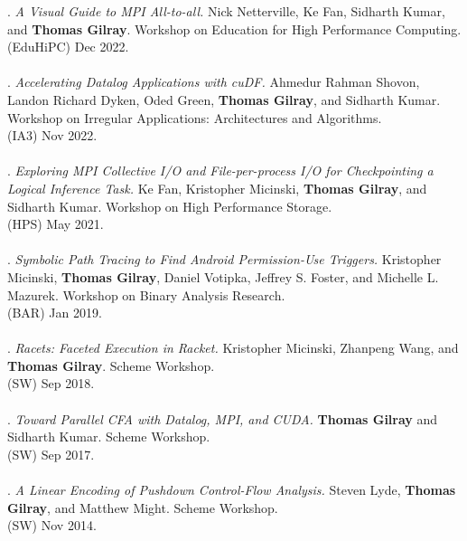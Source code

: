 \paper. \textit{A Visual Guide to MPI All-to-all.}
Nick Netterville, Ke Fan, Sidharth Kumar, and \textbf{Thomas Gilray}.
Workshop on Education for High Performance Computing.
\\(EduHiPC) Dec 2022. 
\\ \vspace{-0.1cm}\\
\paper. \textit{Accelerating Datalog Applications with cuDF.}
Ahmedur Rahman Shovon, Landon Richard Dyken, Oded Green, \textbf{Thomas Gilray}, and Sidharth Kumar.
Workshop on Irregular Applications: Architectures and Algorithms.
\\(IA3) Nov 2022. 
\\ \vspace{-0.1cm}\\
\paper. \textit{Exploring MPI Collective I/O and File-per-process I/O for Checkpointing a Logical Inference Task.}
Ke Fan, Kristopher Micinski, \textbf{Thomas Gilray}, and Sidharth Kumar.
Workshop on High Performance Storage.
\\(HPS) May 2021. 
\\ \vspace{-0.1cm}\\
\paper. \textit{Symbolic Path Tracing to Find Android Permission-Use Triggers.}
Kristopher Micinski, \textbf{Thomas Gilray}, Daniel Votipka, Jeffrey S. Foster, and Michelle L. Mazurek.
Workshop on Binary Analysis Research.
\\(BAR) Jan 2019. 
\\ \vspace{-0.1cm}\\
\paper. \textit{Racets: Faceted Execution in Racket.}
Kristopher Micinski, Zhanpeng Wang, and \textbf{Thomas Gilray}.
Scheme Workshop.
\\(SW) Sep 2018. 
\\ \vspace{-0.1cm}\\
\paper. \textit{Toward Parallel CFA with Datalog, MPI, and CUDA.}
\textbf{Thomas Gilray} and Sidharth Kumar.
Scheme Workshop.
\\(SW) Sep 2017. 
\\ \vspace{-0.1cm}\\
\paper. \textit{A Linear Encoding of Pushdown Control-Flow Analysis.}
Steven Lyde, \textbf{Thomas Gilray}, and Matthew Might.
Scheme Workshop.
\\(SW) Nov 2014. 
\\ \vspace{-0.1cm}\\
